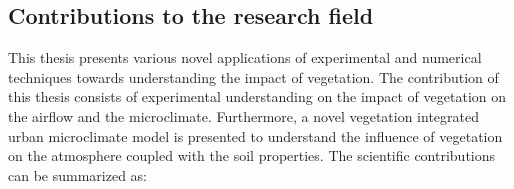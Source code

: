 
\subsection{Contributions to the research field}

This thesis presents various novel applications of experimental and numerical techniques towards understanding the impact of vegetation. The contribution of this thesis consists of experimental understanding on the impact of vegetation on the airflow and the microclimate. Furthermore, a novel vegetation integrated urban microclimate model is presented to understand the influence of vegetation on the atmosphere coupled with the soil properties. The scientific contributions can be summarized as:


